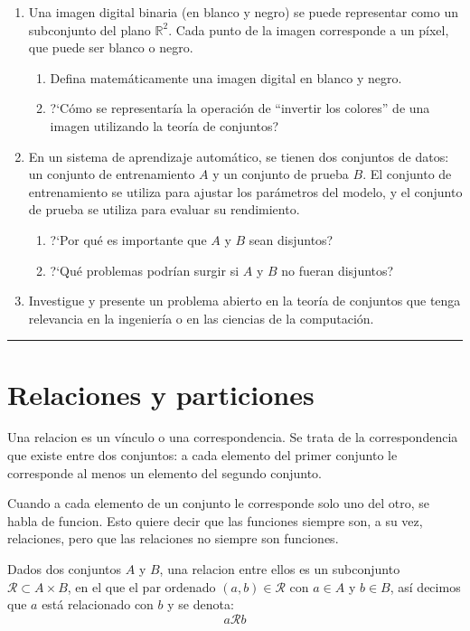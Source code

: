 \begin{enumerate}
	\item Una imagen digital binaria (en blanco y negro) se puede representar como un subconjunto del plano $\mathbb{R}^2$. Cada punto de la imagen corresponde a un píxel, que puede ser blanco o negro.
	\begin{enumerate}[itemsep=-3pt]
		\item Defina matemáticamente una imagen digital en blanco y negro.
		\item ?`Cómo se representaría la operación de ``invertir los colores'' de una imagen utilizando la teoría de conjuntos?
	\end{enumerate}
	
	\item En un sistema de aprendizaje automático, se tienen dos conjuntos de datos: un conjunto de entrenamiento $A$ y un conjunto de prueba $B$. El conjunto de entrenamiento se utiliza para ajustar los parámetros del modelo, y el conjunto de prueba se utiliza para evaluar su rendimiento.
	\begin{enumerate}[itemsep=-3pt]
		\item ?`Por qué es importante que $A$ y $B$ sean disjuntos?
		\item ?`Qué problemas podrían surgir si $A$ y $B$ no fueran disjuntos?
	\end{enumerate}
	
	\item Investigue y presente un problema abierto en la teoría de conjuntos que tenga relevancia en la ingeniería o en las ciencias de la computación.
	
\end{enumerate}

\rule{\textwidth}{.5pt}
\section{Relaciones y particiones}
	Una \gls{relacion} es un vínculo o una correspondencia. Se trata de la correspondencia que existe entre dos conjuntos: a cada elemento del primer conjunto le corresponde al menos un elemento del segundo conjunto.
	
	Cuando a cada elemento de un conjunto le corresponde solo uno del otro, se habla de \gls{funcion}. Esto quiere decir que las funciones siempre son, a su vez, relaciones, pero que las relaciones no siempre son funciones.

\begin{fmd-definition}[Relaciones] 
	Dados dos conjuntos $A$ y $B$, una \gls{relacion} entre ellos es un subconjunto $\mathcal{R} \subset A \times B$, en el que el par ordenado $(a, b) \in \mathcal{R}$ con $a \in A$ y $b \in B$, así decimos que $a$ está relacionado con $b$ y se denota:
	\[ a \mathcal{R} b \]
\end{fmd-definition}

